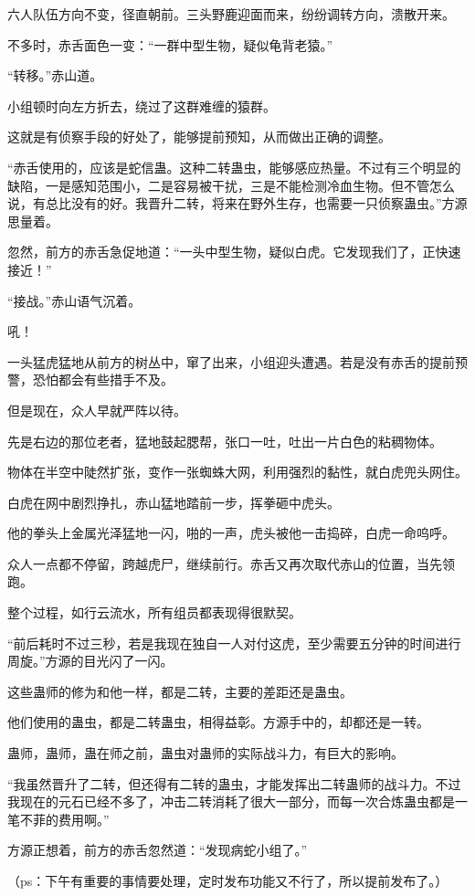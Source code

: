 \begin{this_body}
六人队伍方向不变，径直朝前。三头野鹿迎面而来，纷纷调转方向，溃散开来。

不多时，赤舌面色一变：“一群中型生物，疑似龟背老猿。”

“转移。”赤山道。

小组顿时向左方折去，绕过了这群难缠的猿群。

这就是有侦察手段的好处了，能够提前预知，从而做出正确的调整。

“赤舌使用的，应该是蛇信蛊。这种二转蛊虫，能够感应热量。不过有三个明显的缺陷，一是感知范围小，二是容易被干扰，三是不能检测冷血生物。但不管怎么说，有总比没有的好。我晋升二转，将来在野外生存，也需要一只侦察蛊虫。”方源思量着。

忽然，前方的赤舌急促地道：“一头中型生物，疑似白虎。它发现我们了，正快速接近！”

“接战。”赤山语气沉着。

吼！

一头猛虎猛地从前方的树丛中，窜了出来，小组迎头遭遇。若是没有赤舌的提前预警，恐怕都会有些措手不及。

但是现在，众人早就严阵以待。

先是右边的那位老者，猛地鼓起腮帮，张口一吐，吐出一片白色的粘稠物体。

物体在半空中陡然扩张，变作一张蜘蛛大网，利用强烈的黏性，就白虎兜头网住。

白虎在网中剧烈挣扎，赤山猛地踏前一步，挥拳砸中虎头。

他的拳头上金属光泽猛地一闪，啪的一声，虎头被他一击捣碎，白虎一命呜呼。

众人一点都不停留，跨越虎尸，继续前行。赤舌又再次取代赤山的位置，当先领跑。

整个过程，如行云流水，所有组员都表现得很默契。

“前后耗时不过三秒，若是我现在独自一人对付这虎，至少需要五分钟的时间进行周旋。”方源的目光闪了一闪。

这些蛊师的修为和他一样，都是二转，主要的差距还是蛊虫。

他们使用的蛊虫，都是二转蛊虫，相得益彰。方源手中的，却都还是一转。

蛊师，蛊师，蛊在师之前，蛊虫对蛊师的实际战斗力，有巨大的影响。

“我虽然晋升了二转，但还得有二转的蛊虫，才能发挥出二转蛊师的战斗力。不过我现在的元石已经不多了，冲击二转消耗了很大一部分，而每一次合炼蛊虫都是一笔不菲的费用啊。”

方源正想着，前方的赤舌忽然道：“发现病蛇小组了。”

（ps：下午有重要的事情要处理，定时发布功能又不行了，所以提前发布了。）

\end{this_body}

